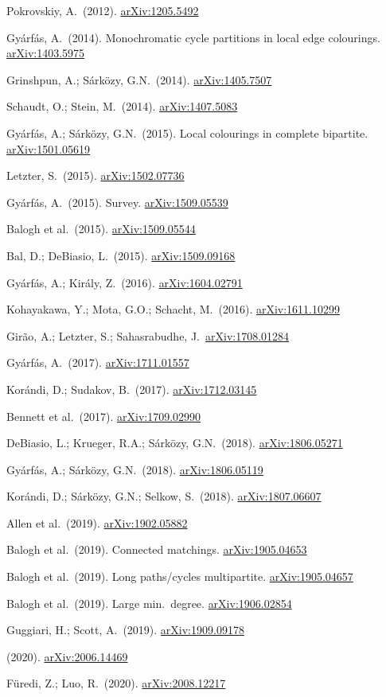 \documentclass[12pt,a4paper,twoside,openright]{book}
\theoremstyle{definition}
\newcommand{\arxiv}[1]{\href{https://arxiv.org/abs/#1}{\textcolor{linkcolor}{arXiv:#1}}}
\begin{document}
\begin{enumerate}[label={[\arabic*]}, leftmargin=2cm]
\item Pokrovskiy, A.\ (2012). \arxiv{1205.5492}
\item Gyárfás, A.\ (2014). Monochromatic cycle partitions in local edge colourings. \arxiv{1403.5975}
\item Grinshpun, A.; Sárközy, G.N.\ (2014). \arxiv{1405.7507}
\item Schaudt, O.; Stein, M.\ (2014). \arxiv{1407.5083}
\item Gyárfás, A.; Sárközy, G.N.\ (2015). Local colourings in complete bipartite. \arxiv{1501.05619}
\item Letzter, S.\ (2015). \arxiv{1502.07736}
\item Gyárfás, A.\ (2015). Survey. \arxiv{1509.05539}
\item Balogh et al.\ (2015). \arxiv{1509.05544}
\item Bal, D.; DeBiasio, L.\ (2015). \arxiv{1509.09168}
\item Gyárfás, A.; Király, Z.\ (2016). \arxiv{1604.02791}
\item Kohayakawa, Y.; Mota, G.O.; Schacht, M.\ (2016). \arxiv{1611.10299}
\item Girão, A.; Letzter, S.; Sahasrabudhe, J.\ \arxiv{1708.01284}
\item Gyárfás, A.\ (2017). \arxiv{1711.01557}
\item Korándi, D.; Sudakov, B.\ (2017). \arxiv{1712.03145}
\item Bennett et al.\ (2017). \arxiv{1709.02990}
\item DeBiasio, L.; Krueger, R.A.; Sárközy, G.N.\ (2018). \arxiv{1806.05271}
\item Gyárfás, A.; Sárközy, G.N.\ (2018). \arxiv{1806.05119}
\item Korándi, D.; Sárközy, G.N.; Selkow, S.\ (2018). \arxiv{1807.06607}
\item Allen et al.\ (2019). \arxiv{1902.05882}
\item Balogh et al.\ (2019). Connected matchings. \arxiv{1905.04653}
\item Balogh et al.\ (2019). Long paths/cycles multipartite. \arxiv{1905.04657}
\item Balogh et al.\ (2019). Large min.\ degree. \arxiv{1906.02854}
\item Guggiari, H.; Scott, A.\ (2019). \arxiv{1909.09178}
\item (2020). \arxiv{2006.14469}
\item Füredi, Z.; Luo, R.\ (2020). \arxiv{2008.12217}

\end{enumerate}
\end{document}
